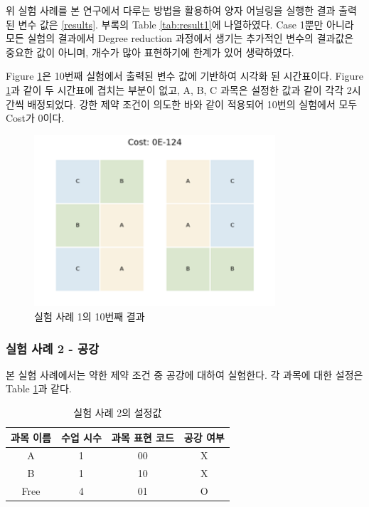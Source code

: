 \documentclass{article}
\begin{document}
위 실험 사례를 본 연구에서 다루는 방법을 활용하여 양자 어닐링을 실행한 결과 출력된 변수 값은 \ref{results}. 부록의 Table \ref{tab:result1}에 나열하였다. Case 1뿐만 아니라 모든 실험의 결과에서 Degree reduction 과정에서 생기는 추가적인 변수의 결과값은 중요한 값이 아니며, 개수가 많아 표현하기에 한계가 있어 생략하였다.

Figure \ref{fig:case1}은 10번째 실험에서 출력된 변수 값에 기반하여 시각화 된 시간표이다. Figure \ref{fig:case1}과 같이 두 시간표에 겹치는 부분이 없고, A, B, C 과목은 설정한 값과 같이 각각 2시간씩 배정되었다. 강한 제약 조건이 의도한 바와 같이 적용되어 10번의 실험에서 모두 Cost가 0이다.

    \begin{figure}[htb!]
        \centering
        \includegraphics[width=0.8\textwidth]{images/Case1.png}
        \caption{실험 사례 1의 10번째 결과}
        \label{fig:case1}
    \end{figure}

    \subsubsection{실험 사례 2 - 공강}

본 실험 사례에서는 약한 제약 조건 중 공강에 대하여 실험한다. 각 과목에 대한 설정은 Table \ref{tab:testcase2}과 같다.

    \begin{table}[htb!]
        \centering
        \begin{tabular}{c c c c}
             \hline
             과목 이름 & 수업 시수 & 과목 표현 코드 & 공강 여부\\
             \hline
             A & 1 & 00 & X\\
             B & 1 & 10 & X\\
             Free & 4 & 01 & O\\
             \hline
        \end{tabular}
        \caption{실험 사례 2의 설정값}\label{tab:testcase2}
    \end{table}
\end{document}
